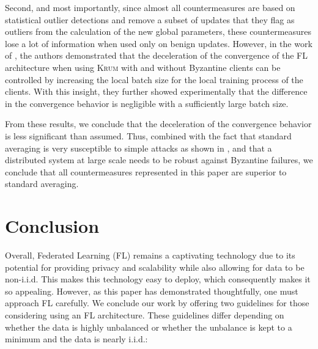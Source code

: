\documentclass[conference]{IEEEtran}
\begin{document}
Second, and most importantly, since almost all countermeasures are based on statistical outlier detections and remove a subset of updates that they flag as outliers from the calculation of the new global parameters, these countermeasures lose a lot of information when used only on benign updates. However, in the work of \cite{Blanchard2017}, the authors demonstrated that the deceleration of the convergence of the FL architecture when using \textsc{Krum} with and without Byzantine clients can be controlled by increasing the local batch size for the local training process of the clients. With this insight, they further showed experimentally that the difference in the convergence behavior is negligible with a sufficiently large batch size.

From these results, we conclude that the deceleration of the convergence behavior is less significant than assumed. Thus, combined with the fact that standard averaging is very susceptible to simple attacks as shown in , and that a distributed system at large scale needs to be robust against Byzantine failures, we conclude that all countermeasures represented in this paper are superior to standard averaging.

\section{Conclusion}
Overall, Federated Learning (FL) remains a captivating technology due to its potential for providing privacy and scalability while also allowing for data to be non-i.i.d. This makes this technology easy to deploy, which consequently makes it so appealing. However, as this paper has demonstrated thoughtfully, one must approach FL carefully. We conclude our work by offering two guidelines for those considering using an FL architecture. These guidelines differ depending on whether the data is highly unbalanced or whether the unbalance is kept to a minimum and the data is nearly i.i.d.:
\end{document}
